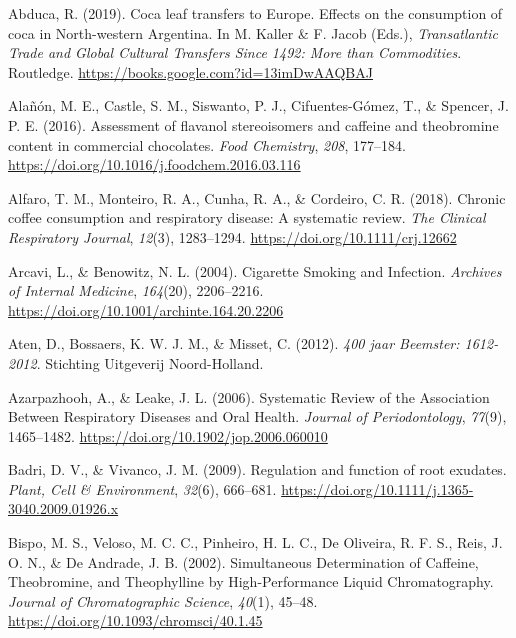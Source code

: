 \documentclass[
  11pt,
  leqno]{scrartcl}
\newlength{\cslhangindent}
\newenvironment{CSLReferences}[2] %
 {\begin{list}{}{%
  \setlength{\itemindent}{0pt}
  \setlength{\leftmargin}{0pt}
  \setlength{\parsep}{0pt}
  \ifodd #1
   \setlength{\leftmargin}{\cslhangindent}
   \setlength{\itemindent}{-1\cslhangindent}
  \fi
  \setlength{\itemsep}{#2\baselineskip}}}
 {\end{list}}
\begin{document}
\label{refs}
\begin{CSLReferences}{1}{0}
Abduca, R. (2019). Coca leaf transfers to {Europe}. {Effects} on the
consumption of coca in {North-western Argentina}. In M. Kaller \& F.
Jacob (Eds.), \emph{Transatlantic {Trade} and {Global Cultural Transfers
Since} 1492: {More} than {Commodities}}. {Routledge}.
\url{https://books.google.com?id=13imDwAAQBAJ}

Alañón, M. E., Castle, S. M., Siswanto, P. J., Cifuentes-Gómez, T., \&
Spencer, J. P. E. (2016). Assessment of flavanol stereoisomers and
caffeine and theobromine content in commercial chocolates. \emph{Food
Chemistry}, \emph{208}, 177--184.
\url{https://doi.org/10.1016/j.foodchem.2016.03.116}

Alfaro, T. M., Monteiro, R. A., Cunha, R. A., \& Cordeiro, C. R. (2018).
Chronic coffee consumption and respiratory disease: {A} systematic
review. \emph{The Clinical Respiratory Journal}, \emph{12}(3),
1283--1294. \url{https://doi.org/10.1111/crj.12662}

Arcavi, L., \& Benowitz, N. L. (2004). Cigarette {Smoking} and
{Infection}. \emph{Archives of Internal Medicine}, \emph{164}(20),
2206--2216. \url{https://doi.org/10.1001/archinte.164.20.2206}

Aten, D., Bossaers, K. W. J. M., \& Misset, C. (2012). \emph{400 jaar
Beemster: 1612-2012}. {Stichting Uitgeverij Noord-Holland}.

Azarpazhooh, A., \& Leake, J. L. (2006). Systematic {Review} of the
{Association Between Respiratory Diseases} and {Oral Health}.
\emph{Journal of Periodontology}, \emph{77}(9), 1465--1482.
\url{https://doi.org/10.1902/jop.2006.060010}

Badri, D. V., \& Vivanco, J. M. (2009). Regulation and function of root
exudates. \emph{Plant, Cell \& Environment}, \emph{32}(6), 666--681.
\url{https://doi.org/10.1111/j.1365-3040.2009.01926.x}

Bispo, M. S., Veloso, M. C. C., Pinheiro, H. L. C., De Oliveira, R. F.
S., Reis, J. O. N., \& De Andrade, J. B. (2002). Simultaneous
{Determination} of {Caffeine}, {Theobromine}, and {Theophylline} by
{High-Performance Liquid Chromatography}. \emph{Journal of
Chromatographic Science}, \emph{40}(1), 45--48.
\url{https://doi.org/10.1093/chromsci/40.1.45}


\end{CSLReferences}
\end{document}
